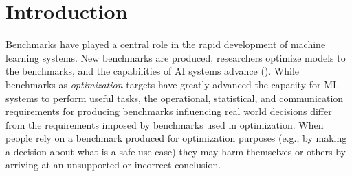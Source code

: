 \documentclass{article}
\begin{document}
% 




\section{Introduction}
Benchmarks have played a central role in the rapid development of machine learning systems. New benchmarks are produced, researchers optimize models to the benchmarks, and the capabilities of AI systems advance (\cite{deng2009,srivastava2022}). While benchmarks as \textit{optimization} targets have greatly advanced the capacity for ML systems to perform useful tasks, the operational, statistical, and communication requirements for producing benchmarks influencing real world decisions differ from the requirements imposed by benchmarks used in optimization. When people rely on a benchmark produced for optimization purposes (e.g., by making a decision about what is a safe use case) they may harm themselves or others by arriving at an unsupported or incorrect conclusion.
\end{document}
